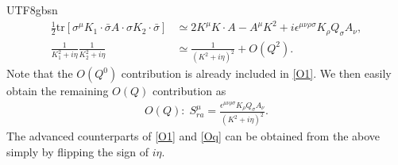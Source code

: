 \documentclass[11pt]{article}\def\baselinestretch{1.4}
\def\e{{\epsilon}}
\def\h{\eta}
\def\m{{\mu}}
\def\n{{\nu}}
\def\r{{\rho}}
\def\s{{\sigma}}
\newcommand{\tr}{\text{tr}}
\begin{document}
\begin{CJK}{UTF8}{gbsn}
\begin{align}
\frac{1}{2}\tr[\s^\m K_1\cdot\bar{\s}A\cdot\s K_2\cdot\bar{\s}]&\simeq 2K^\m K\cdot A-A^\m K^2+i \e^{\m\n\r\s} K_\r Q_\s A_\n,\nonumber\\
\frac{1}{K_1^2+i\h}\frac{1}{K_2^2+i\h}&\simeq \frac{1}{(K^2+i\h)^2}+O(Q^2).
\end{align}
Note that the $O(Q^0)$ contribution is already included in \eqref{O1}. We then easily obtain the remaining $O(Q)$ contribution as
\begin{align}\label{Oq}
O(Q):\;S_{ra}^\m=\frac{ \e^{\m\n\r\s} K_\r Q_\s A_\n}{(K^2+i\h)^2}.
\end{align}
The advanced counterparts of \eqref{O1} and \eqref{Oq} can be obtained from the above simply by flipping the sign of $i\h$.

\end{CJK}
\end{document}
